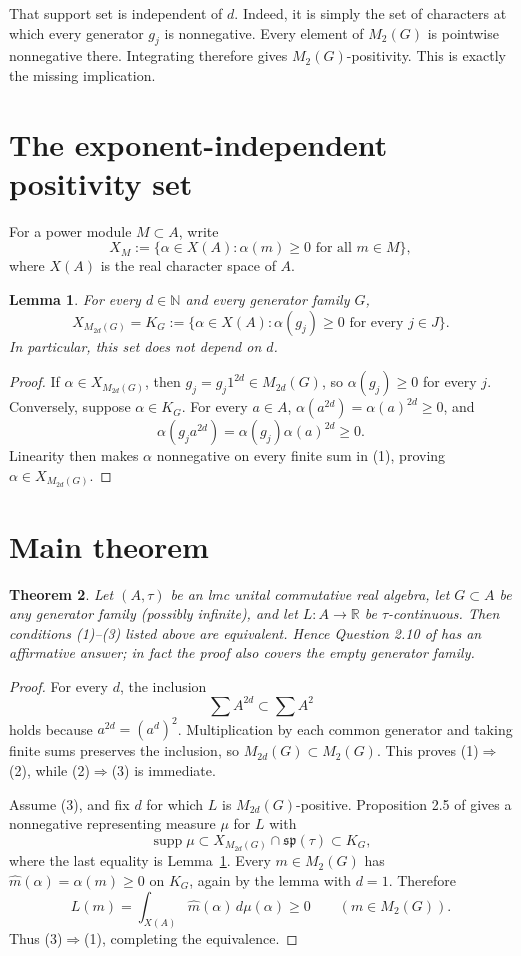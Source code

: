 \documentclass[11pt]{article}
\newtheorem{theorem}{Theorem}
\newtheorem{lemma}[theorem]{Lemma}
\newcommand{\R}{\mathbb R}
\newcommand{\N}{\mathbb N}
\newcommand{\spn}{\mathfrak{sp}}
\begin{document}
That support set is independent of $d$.  Indeed, it is simply the set of
characters at which every generator $g_j$ is nonnegative.  Every element of
$M_2(G)$ is pointwise nonnegative there.  Integrating therefore gives
$M_2(G)$-positivity.  This is exactly the missing implication.

\section{The exponent-independent positivity set}

For a power module $M\subset A$, write
\[
 X_M:=\{\alpha\in X(A):\alpha(m)\ge0\text{ for all }m\in M\},
\]
where $X(A)$ is the real character space of $A$.

\begin{lemma}\label{lem:support}
For every $d\in\N$ and every generator family $G$,
\[
 X_{M_{2d}(G)}
 =K_G:=\{\alpha\in X(A):\alpha(g_j)\ge0\text{ for every }j\in J\}.
 \tag{2}
\]
In particular, this set does not depend on $d$.
\end{lemma}

\begin{proof}
If $\alpha\in X_{M_{2d}(G)}$, then
$g_j=g_j1^{2d}\in M_{2d}(G)$, so $\alpha(g_j)\ge0$ for every $j$.
Conversely, suppose $\alpha\in K_G$.  For every $a\in A$,
$\alpha(a^{2d})=\alpha(a)^{2d}\ge0$, and
\[
 \alpha(g_ja^{2d})=\alpha(g_j)\alpha(a)^{2d}\ge0.
\]
Linearity then makes $\alpha$ nonnegative on every finite sum in (1), proving
$\alpha\in X_{M_{2d}(G)}$.
\end{proof}

\section{Main theorem}

\begin{theorem}\label{thm:main}
Let $(A,\tau)$ be an lmc unital commutative real algebra, let
$G\subset A$ be any generator family (possibly infinite), and let
$L:A\to\R$ be $\tau$-continuous.  Then conditions (1)--(3) listed above are
equivalent.  Hence Question 2.10 of \cite{IK} has an affirmative answer; in
fact the proof also covers the empty generator family.
\end{theorem}

\begin{proof}
For every $d$, the inclusion
\[
 \sum A^{2d}\subset\sum A^2
\]
holds because $a^{2d}=(a^d)^2$.  Multiplication by each common generator and
taking finite sums preserves the inclusion, so
$M_{2d}(G)\subset M_2(G)$.  This proves (1)$\Rightarrow$(2), while
(2)$\Rightarrow$(3) is immediate.

Assume (3), and fix $d$ for which $L$ is $M_{2d}(G)$-positive.  Proposition
2.5 of \cite{IK} gives a nonnegative representing measure $\mu$ for $L$ with
\[
 \operatorname{supp}\mu
 \subset X_{M_{2d}(G)}\cap\spn(\tau)
 \subset K_G,
 \tag{3}
\]
where the last equality is Lemma~\ref{lem:support}.  Every
$m\in M_2(G)$ has $\widehat m(\alpha)=\alpha(m)\ge0$ on $K_G$, again by the
lemma with $d=1$.  Therefore
\[
 L(m)=\int_{X(A)}\widehat m(\alpha)\,d\mu(\alpha)\ge0
 \qquad(m\in M_2(G)).
\]
Thus (3)$\Rightarrow$(1), completing the equivalence.
\end{proof}
\end{document}
